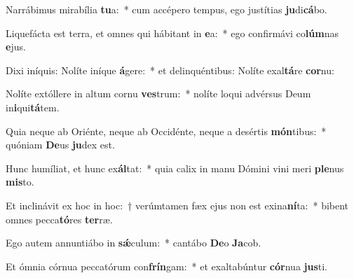 \item Narrábimus mirabília \textbf{tu}a:~* cum accépero tempus, ego justítias \textbf{ju}di\textbf{cá}bo.
\item Liquefácta est terra, et omnes qui hábitant in \textbf{e}a:~* ego confirmávi co\textbf{lúm}nas \textbf{e}jus.
\item Dixi iníquis: Nolíte iníque \textbf{á}gere:~* et delinquéntibus: Nolíte exal\textbf{tá}re \textbf{cor}nu:
\item Nolíte extóllere in altum cornu \textbf{ves}trum:~* nolíte loqui advérsus Deum in\textbf{i}qui\textbf{tá}tem.
\item Quia neque ab Oriénte, neque ab Occidénte, neque a desértis \textbf{món}tibus:~* quóniam \textbf{De}us \textbf{ju}dex est.
\item Hunc humíliat, et hunc ex\textbf{ál}tat:~* quia calix in manu Dómini vini meri \textbf{ple}nus \textbf{mis}to.
\item Et inclinávit ex hoc in hoc:~† verúmtamen fæx ejus non est exina\textbf{ní}ta:~* bibent omnes pecca\textbf{tó}res \textbf{ter}ræ.
\item Ego autem annuntiábo in \textbf{sǽ}culum:~* cantábo \textbf{De}o \textbf{Ja}cob.
\item Et ómnia córnua peccatórum con\textbf{frín}gam:~* et exaltabúntur \textbf{cór}nua \textbf{jus}ti.
